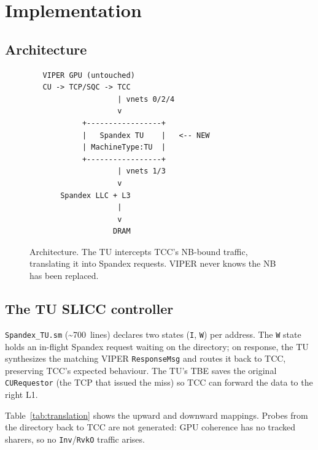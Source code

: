 \documentclass[conference,letterpaper,10pt]{IEEEtran}
\begin{document}
\section{Implementation}

\subsection{Architecture}

\begin{figure}[t]
\centering
\begin{verbatim}
   VIPER GPU (untouched)
   CU -> TCP/SQC -> TCC
                    | vnets 0/2/4
                    v
            +-----------------+
            |   Spandex TU    |   <-- NEW
            | MachineType:TU  |
            +-----------------+
                    | vnets 1/3
                    v
       Spandex LLC + L3
                    |
                    v
                   DRAM
\end{verbatim}
\caption{Architecture. The TU intercepts TCC's \textsc{NB}-bound
traffic, translating it into Spandex requests. VIPER never knows the
\textsc{NB} has been replaced.}
\label{fig:arch}
\end{figure}

\subsection{The TU SLICC controller}
\texttt{Spandex\_TU.sm} (\textasciitilde 700~lines) declares two states
(\texttt{I}, \texttt{W}) per address. The \texttt{W} state holds an
in-flight Spandex request waiting on the directory; on response, the
TU synthesizes the matching VIPER \texttt{ResponseMsg} and routes it
back to TCC, preserving TCC's expected behaviour. The TU's TBE saves
the original \texttt{CURequestor} (the TCP that issued the miss) so
TCC can forward the data to the right L1.

Table~\ref{tab:translation} shows the upward and downward mappings.
Probes from the directory back to TCC are not generated: GPU coherence
has no tracked sharers, so no \texttt{Inv}/\texttt{RvkO} traffic
arises.
\end{document}
